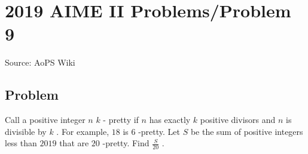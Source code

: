 \documentclass[12pt]{article}
\begin{document}
\section*{{2019 AIME II Problems/Problem 9}}
Source: AoPS Wiki

\subsection*{Problem}
Call a positive integer $n$ $k$ - pretty if $n$ has exactly $k$ positive divisors and $n$ is divisible by $k$ . For example, $18$ is $6$ -pretty. Let $S$ be the sum of positive integers less than $2019$ that are $20$ -pretty. Find $\tfrac{S}{20}$ .
\end{document}
